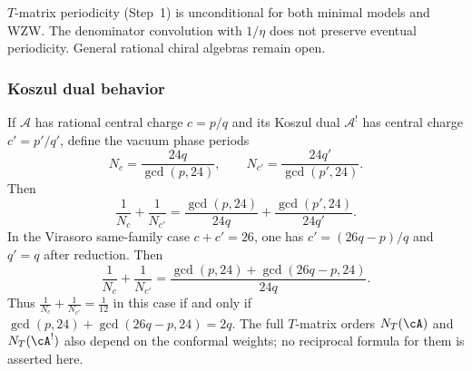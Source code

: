 \begin{remark}[Scope]\label{rem:wzw-periodicity-scope}
$T$-matrix periodicity (Step~1) is unconditional for both minimal
models and WZW. The denominator convolution with $1/\eta$ does not
preserve eventual periodicity. General rational chiral algebras remain
open.
\end{remark}

\subsubsection{Koszul dual behavior}

\begin{conjecture}\label{conj:reflected-modular-periodicity}
If $\mathcal{A}$ has rational central charge $c = p/q$ and its
Koszul dual $\mathcal{A}^!$ has central charge $c' = p'/q'$, define
the vacuum phase periods
\[
N_c=\frac{24q}{\gcd(p,24)},\qquad
N_{c'}=\frac{24q'}{\gcd(p',24)}.
\]
Then
\begin{equation}\label{eq:period-sum}
\frac{1}{N_c} + \frac{1}{N_{c'}}
= \frac{\gcd(p,24)}{24q}
 + \frac{\gcd(p',24)}{24q'}.
\end{equation}
In the Virasoro same-family case $c+c'=26$, one has
$c'=(26q-p)/q$ and $q'=q$ after reduction. Then
\[
\frac{1}{N_c}+\frac{1}{N_{c'}}
=\frac{\gcd(p,24)+\gcd(26q-p,24)}{24q}.
\]
Thus $\frac{1}{N_c} + \frac{1}{N_{c'}} = \frac{1}{12}$ in this case if and
only if $\gcd(p,24)+\gcd(26q-p,24)=2q$.
The full $T$-matrix orders $N_T(\cA)$ and $N_T(\cA^!)$ also depend on
the conformal weights; no reciprocal formula for them is asserted here.
\end{conjecture}

